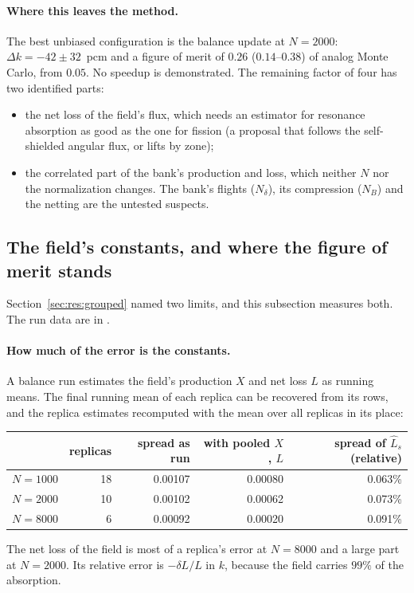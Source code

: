 \paragraph{Where this leaves the method.} The best unbiased configuration is the balance update at
$N=2000$: $\Delta k=-42\pm32$~pcm and a figure of merit of $0.26$ ($0.14$--$0.38$) of analog Monte
Carlo, from $0.05$. No speedup is demonstrated. The remaining factor of four has two identified
parts:
\begin{itemize}
\item the net loss of the field's flux, which needs an estimator for resonance absorption as good as
  the one for fission (a proposal that follows the self-shielded angular flux, or lifts by zone);
\item the correlated part of the bank's production and loss, which neither $N$ nor the
  normalization changes. The bank's flights ($N_\delta$), its compression ($N_B$) and the netting
  are the untested suspects.
\end{itemize}

\subsection{The field's constants, and where the figure of merit stands}\label{sec:res:constants}

Section~\ref{sec:res:grouped} named two limits, and this subsection measures both. The run data are
in .

\paragraph{How much of the error is the constants.} A balance run estimates the field's production
$X$ and net loss $L$ as running means. The final running mean of each replica can be recovered
from its rows, and the replica estimates recomputed with the mean over all replicas in its place:
\begin{center}\small
\begin{tabular}{@{}lrrrr@{}}
\toprule
 & replicas & spread as run & with pooled $X$, $L$ & spread of $\hat L_s$ (relative)\\
\midrule
$N=1000$ & 18 & 0.00107 & 0.00080 & 0.063\%\\
$N=2000$ & 10 & 0.00102 & 0.00062 & 0.073\%\\
$N=8000$ & 6 & 0.00092 & 0.00020 & 0.091\%\\
\bottomrule
\end{tabular}
\end{center}
The net loss of the field is most of a replica's error at $N=8000$ and a large part at
$N=2000$. Its relative error is $-\delta L/L$ in $k$, because the field carries $99\%$ of the
absorption.

